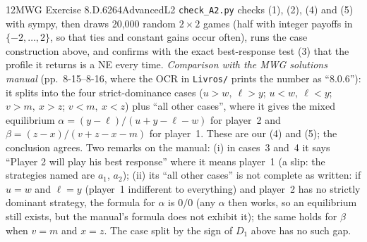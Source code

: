 \begin{exsol}{12}{MWG Exercise 8.D.6}{264}{Advanced}{L2}
\verify \texttt{check\_A2.py} checks (1), (2), (4) and (5) with sympy, then draws 20{,}000 random
$2\times2$ games (half with integer payoffs in $\{-2,\dots,2\}$, so that ties and constant gains
occur often), runs the case construction above, and confirms with the exact best-response test (3)
that the profile it returns is a NE every time. \emph{Comparison with the MWG solutions manual}
(pp.~8-15--8-16, where the OCR in \texttt{Livros/} prints the number as ``8.0.6''): it splits into
the four strict-dominance cases ($u > w,\ \ell > y$; $u < w,\ \ell < y$; $v > m,\ x > z$;
$v < m,\ x < z$) plus ``all other cases'', where it gives the mixed equilibrium
$\alpha = (y - \ell)/(u + y - \ell - w)$ for player~2 and $\beta = (z - x)/(v + z - x - m)$ for
player~1. These are our (4) and (5); the conclusion agrees. Two remarks on the manual: (i) in
cases~3 and~4 it says ``Player 2 will play his best response'' where it means player~1 (a slip:
the strategies named are $a_1$, $a_2$); (ii) its ``all other cases'' is not complete as written:
if $u = w$ and $\ell = y$ (player~1 indifferent to everything) and player~2 has no strictly
dominant strategy, the formula for $\alpha$ is $0/0$ (any $\alpha$ then works, so an equilibrium
still exists, but the manual's formula does not exhibit it); the same holds for $\beta$ when
$v = m$ and $x = z$. The case split by the sign of $D_1$ above has no such gap.

\end{exsol}
